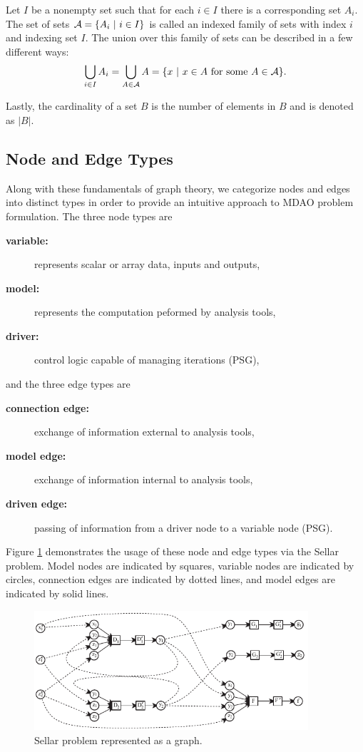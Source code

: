   Let $I$ be a nonempty set such that for each $i \in I$ there is a corresponding set $A_i$. 
  The set of sets $\mathcal A = \{A_i \ | \  i \in I\}$ is called an indexed family of sets with index $i$ and 
  indexing set $I$\cite{smith2006}. 
  The union over this family of sets can be described in a few different ways:
  \begin{equation}
  \bigcup_{i \in I} A_i = \bigcup_{A \in \mathcal A} A = \{x \ | \  x \in A \textrm{ for some } A \in \mathcal A\}.
  \end{equation}

  Lastly, the cardinality of a set $B$ is the number of elements in $B$ and is denoted as $|B|$.

\subsection{Node and Edge Types}
  \label{ss:types}
Along with these fundamentals of graph theory, we categorize nodes and edges into distinct types in order to provide an intuitive approach to MDAO problem formulation. The three node types are
  \begin{description}
    \item[\bf{variable:}] represents scalar or array data, inputs and outputs,
    \item[\bf{model:}] represents the computation peformed by analysis tools,
    \item[\bf{driver:}] control logic capable of managing iterations (PSG),
  \end{description}
and the three edge types are
  \begin{description}
  \item[\bf{connection edge:}] exchange of information external to analysis tools,
  \item[\bf{model edge:}] exchange of information internal to analysis tools,
  \item[\bf{driven edge:}] passing of information from a driver node to a variable node (PSG).
  \end{description}
Figure \ref{f:sellar types} demonstrates the usage of these node and edge types via the Sellar problem. Model nodes are indicated by squares, variable nodes are indicated by circles, connection edges are indicated by dotted lines, and model edges are indicated by solid lines.
\begin{figure}[htb!]
  \begin{center}
    \includegraphics[width=4.0in]{images/sellar_types}
  \end{center}
  \caption{Sellar problem represented as a graph.}
\label{f:sellar types}
\end{figure} 

